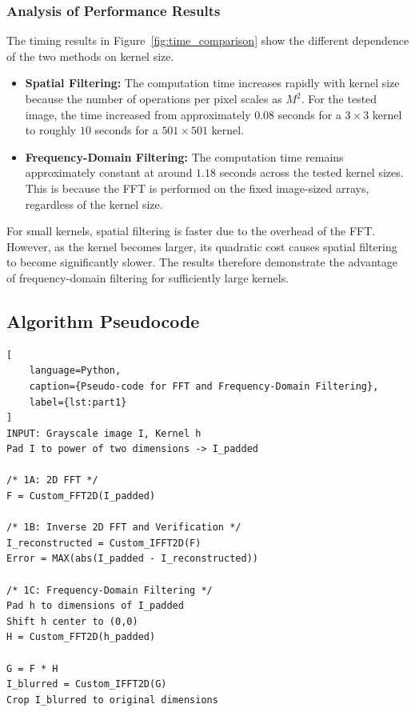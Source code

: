\documentclass[11pt,a4paper]{article}
\begin{document}
\subsubsection{Analysis of Performance Results}

The timing results in Figure~\ref{fig:time_comparison} show the different dependence of the two methods on kernel size.

\begin{itemize}
    \item \textbf{Spatial Filtering:}
    The computation time increases rapidly with kernel size because the number of operations per pixel scales as $M^2$. For the tested image, the time increased from approximately $0.08$ seconds for a $3\times3$ kernel to roughly $10$ seconds for a $501\times501$ kernel.

    \item \textbf{Frequency-Domain Filtering:}
    The computation time remains approximately constant at around $1.18$ seconds across the tested kernel sizes. This is because the FFT is performed on the fixed image-sized arrays, regardless of the kernel size.
\end{itemize}

For small kernels, spatial filtering is faster due to the overhead of the FFT. However, as the kernel becomes larger, its quadratic cost causes spatial filtering to become significantly slower. The results therefore demonstrate the advantage of frequency-domain filtering for sufficiently large kernels.

\subsection{Algorithm Pseudocode}
\begin{lstlisting}[
    language=Python,
    caption={Pseudo-code for FFT and Frequency-Domain Filtering},
    label={lst:part1}
]
INPUT: Grayscale image I, Kernel h
Pad I to power of two dimensions -> I_padded

/* 1A: 2D FFT */
F = Custom_FFT2D(I_padded)

/* 1B: Inverse 2D FFT and Verification */
I_reconstructed = Custom_IFFT2D(F)
Error = MAX(abs(I_padded - I_reconstructed))

/* 1C: Frequency-Domain Filtering */
Pad h to dimensions of I_padded
Shift h center to (0,0)
H = Custom_FFT2D(h_padded)

G = F * H
I_blurred = Custom_IFFT2D(G)
Crop I_blurred to original dimensions
\end{lstlisting}
\end{document}
